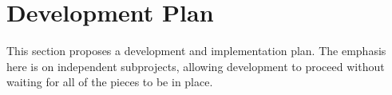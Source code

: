 \documentclass{article}
\begin{document}




\section{Development Plan}
\label{sec:development}
This section proposes a development and implementation plan.  The
emphasis here is on independent subprojects, allowing development to
proceed without waiting for all of the pieces to be in place.
\end{document}
